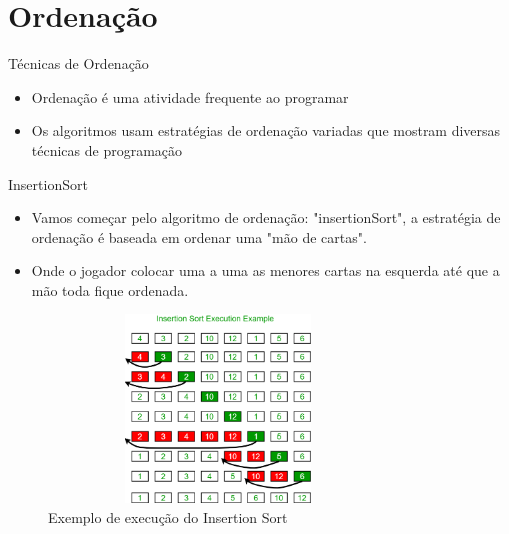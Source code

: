 \section*{Ordenação}

\begin{frame}
	\begin{block}{Técnicas de Ordenação}
		\begin{itemize}
			\item Ordenação é uma atividade frequente ao programar
			
			\item Os algoritmos usam estratégias de ordenação variadas que mostram diversas técnicas de programação
		\end{itemize}
	\end{block}
\end{frame}


\begin{frame}
	\begin{block}{InsertionSort}
		\begin{itemize}
			\item Vamos começar pelo algoritmo de ordenação: "insertionSort", a estratégia de ordenação é baseada em ordenar uma "mão de cartas". 

			\item Onde o jogador colocar uma a uma as menores cartas na esquerda até que a mão toda fique ordenada.
		\end{itemize}
	\end{block}
\end{frame}

\begin{frame}	
	\begin{block}{}	
		 \begin{figure}[!htb]
			\centering	  				
			\includegraphics[height=5cm, width = 9cm]{./pic/insertionsort.png}
			\caption{Exemplo de execução do Insertion Sort}
			\label{fig_analise_insertion}
		\end{figure}
	\end{block}
\end{frame}

